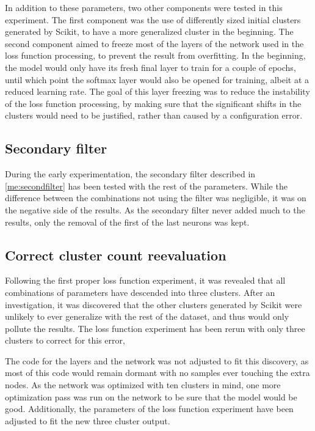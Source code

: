 In addition to these parameters, two other components were tested in this experiment.
The first component was the use of differently sized initial clusters generated by Scikit, to have a more generalized cluster in the beginning.
The second component aimed to freeze most of the layers of the network used in the loss function processing, to prevent the result from overfitting.
In the beginning, the model would only have its fresh final layer to train for a couple of epochs, until which point the softmax layer would also be opened for training, albeit at a reduced learning rate.
The goal of this layer freezing was to reduce the instability of the loss function processing, by making sure that the significant shifts in the clusters would need to be justified, rather than caused by a configuration error.

\subsection{Secondary filter}
\label{ex:loss:secondfilter}
During the early experimentation, the secondary filter described in \cref{me:secondfilter} has been tested with the rest of the parameters.
While the difference between the combinations not using the filter was negligible, it was on the negative side of the results.
As the secondary filter never added much to the results, only the removal of the first of the last neurons was kept.

\subsection{Correct cluster count reevaluation}
Following the first proper loss function experiment, it was revealed that all combinations of parameters have descended into three clusters.
After an investigation, it was discovered that the other clusters generated by Scikit were unlikely to ever generalize with the rest of the dataset, and thus would only pollute the results.
The loss function experiment has been rerun with only three clusters to correct for this error,

The code for the layers and the network was not adjusted to fit this discovery, as most of this code would remain dormant with no samples ever touching the extra nodes.
As the network was optimized with ten clusters in mind, one more optimization pass was run on the network to be sure that the model would be good.
Additionally, the parameters of the loss function experiment have been adjusted to fit the new three cluster output.

